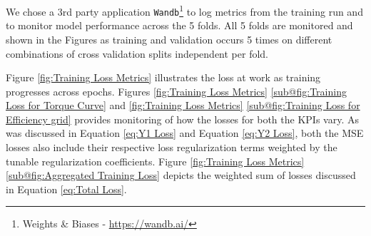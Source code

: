 \documentclass{report} %
\begin{document}
We chose a 3rd party application \texttt{Wandb}\footnote{Weights \& Biases - \url{https://wandb.ai/}} to log metrics from the training run and to monitor model performance across the 5 folds.
All 5 folds are monitored and shown in the Figures as training and validation occurs 5 times on different combinations of cross validation splits independent per fold.

Figure \ref{fig:Training Loss Metrics} illustrates the loss at work as training progresses across epochs. 
Figures \ref{fig:Training Loss Metrics} \ref{sub@fig:Training Loss for Torque Curve} and \ref{fig:Training Loss Metrics} \ref{sub@fig:Training Loss for Efficiency grid} 
provides monitoring of how the losses for both the \ac{KPI}s vary. As was discussed in Equation \ref{eq:Y1 Loss} and Equation \ref{eq:Y2 Loss}, both the \ac{MSE} losses 
also include their respective loss regularization terms weighted by the tunable regularization coefficients. 
Figure \ref{fig:Training Loss Metrics} \ref{sub@fig:Aggregated Training Loss} depicts the weighted sum of losses 
discussed in Equation \ref{eq:Total Loss}.
\end{document}
